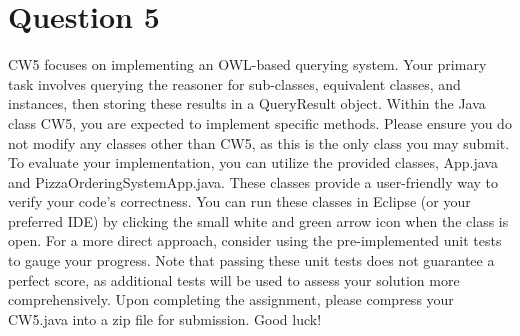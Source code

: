 \documentclass{article}
\begin{document}
    \section{Question 5}
    CW5 focuses on implementing an OWL-based querying system. Your primary task involves querying the reasoner for sub-classes, equivalent classes, and instances, then storing these results in a QueryResult object. Within the Java class CW5, you are expected to implement specific methods. Please ensure you do not modify any classes other than CW5, as this is the only class you may submit. To evaluate your implementation, you can utilize the provided classes, App.java and PizzaOrderingSystemApp.java. These classes provide a user-friendly way to verify your code's correctness. You can run these classes in Eclipse (or your preferred IDE) by clicking the small white and green arrow icon when the class is open. For a more direct approach, consider using the pre-implemented unit tests to gauge your progress. Note that passing these unit tests does not guarantee a perfect score, as additional tests will be used to assess your solution more comprehensively. Upon completing the assignment, please compress your CW5.java into a zip file for submission. Good luck!
\end{document}
